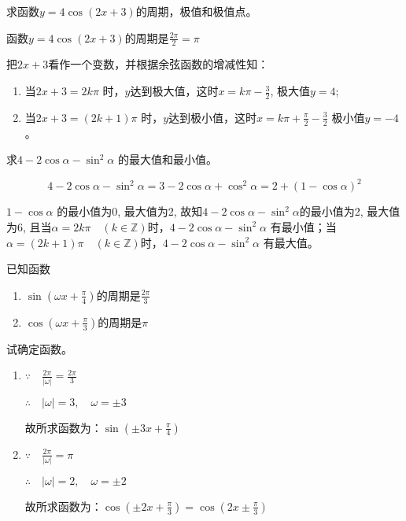 \begin{example}
    求函数$y=4\cos(2x+3)$的周期，极值和极值点。
\end{example}

\begin{solution}
    函数$y=4\cos(2x+3)$的周期是$\frac{2\pi}{2}=\pi$

把$2x+3$看作一个变数，并根据余弦函数的增减性知：
\begin{enumerate}
    \item 当$2x+3=2k\pi$ 时，$y$达到极大值，这时$x=k\pi -\frac{3}{2}$,
    极大值$y=4$;
    \item 当$2x+3=(2k+1)\pi$ 时，$y$达到极小值，这时$x=k\pi +\frac{\pi}{2}-\frac{3}{2}$
    极小值$y=-4$。
\end{enumerate}
\end{solution}


\begin{example}
    求$4-2\cos\alpha -\sin^2\alpha$ 的最大值和最小值。
\end{example}


\begin{solution}
    \[4-2\cos\alpha -\sin^2\alpha=3-2\cos\alpha+\cos^2\alpha = 2+(1-\cos\alpha)^2\]

$1-\cos\alpha$ 的最小值为0, 最大值为2, 故知$4-2\cos\alpha -\sin^2\alpha$的最小值为2, 最大值为6, 且当$\alpha=2k\pi\quad  (k\in\mathbb{Z})$时，$4-2\cos\alpha -\sin^2\alpha$ 有最小值；当$\alpha =(2k+1)\pi\quad  (k\in\mathbb{Z})$时，$4-2\cos\alpha -\sin^2\alpha$ 有最大值。
\end{solution}

\begin{example}
    已知函数
\begin{enumerate}
    \item $\sin\left(\omega x+\frac{\pi}{4}\right)$的周期是$\frac{2\pi}{3}$
    \item $\cos\left(\omega x+\frac{\pi}{3}\right)$的周期是$\pi$
\end{enumerate}    
试确定函数。    
\end{example}

\begin{solution}
\begin{enumerate}
    \item $\because\quad \frac{2\pi}{|\omega|}=\frac{2\pi}{3}$
    
$\therefore\quad |\omega|=3,\quad \omega=\pm 3$

故所求函数为：$\sin\left(\pm 3x+\frac{\pi}{4}\right)$

\item $\because\quad \frac{2\pi}{|\omega|}=\pi$
    
$\therefore\quad |\omega|=2,\quad \omega=\pm 2$

故所求函数为：$\cos\left(\pm 2x+\frac{\pi}{3}\right)=\cos\left(2x\pm \frac{\pi}{3}\right)$
\end{enumerate}  
\end{solution}

